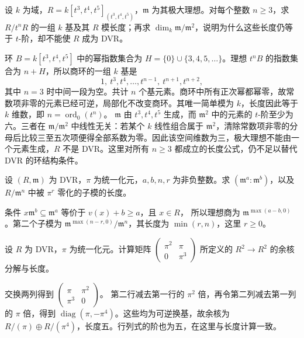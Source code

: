 \begin{exercise}\label{b3:ex:10-cusp-fails-dvr}
	设 \(k\) 为域，\(R=k[t^3,t^4,t^5]_{(t^3,t^4,t^5)}\)，\(\mathfrak m\) 为其极大理想。对每个整数 \(n\ge3\)，求 \(R/t^nR\) 的一组 \(k\) 基及其 \(R\) 模长度；再求 \(\dim_k\mathfrak m/\mathfrak m^2\)，说明为什么这些长度仍等于 \(t\)-阶，却不能使 \(R\) 成为 DVR。
\end{exercise}
\begin{solution}
	环 \(B=k[t^3,t^4,t^5]\) 中的幂指数集合为 \(H=\{0\}\cup\{3,4,5,\ldots\}\)。理想 \(t^nB\) 的指数集合为 \(n+H\)，所以商环的一组 \(k\) 基是
	\[
		1,\ t^3,t^4,\ldots,t^{n-1},\ t^{n+1},t^{n+2},
	\]
	其中 \(n=3\) 时中间一段为空。共计 \(n\) 个基元素。商环中所有正次幂都幂零，故常数项非零的元素已经可逆，局部化不改变商环。其唯一简单模为 \(k\)，长度因此等于 \(k\) 维数，即 \(n=\operatorname{ord}_0(t^n)\)。 \(\mathfrak m\) 由 \(t^3,t^4,t^5\) 生成，而 \(\mathfrak m^2\) 中的元素的 \(t\)-阶至少为六。三者在 \(\mathfrak m/\mathfrak m^2\) 中线性无关：若某个 \(k\) 线性组合属于 \(\mathfrak m^2\)，清除常数项非零的分母后比较三至五次项便得全部系数为零。因此该空间维数为三，极大理想不能由一个元素生成，\(R\) 不是 DVR。这里对所有 \(n\ge3\) 都成立的长度公式，仍不足以替代 DVR 的环结构条件。
\end{solution}

\begin{exercise}\label{b3:ex:10-dvr-colon}
	设 \((R,\mathfrak m)\) 为 DVR，\(\pi\) 为统一化元，\(a,b,n,r\) 为非负整数。求 \((\mathfrak m^a:\mathfrak m^b)\)，以及 \(R/\mathfrak m^n\) 中被 \(\pi^r\) 零化的子模的长度。
\end{exercise}
\begin{solution}
	条件 \(x\mathfrak m^b\subseteq\mathfrak m^a\) 等价于 \(v(x)+b\ge a\)，且 \(x\in R\)， 所以理想商为 \(\mathfrak m^{\max(a-b,0)}\)。第二个子模为 \(\mathfrak m^{\max(n-r,0)}/\mathfrak m^n\)，其长度为 \(\min(r,n)\)，这里 \(r\ge0\)。
\end{solution}

\begin{exercise}\label{b3:ex:10-dvr-presentation}
	设 \(R\) 为 DVR，\(\pi\) 为统一化元。计算矩阵
	\(\left(\begin{smallmatrix}\pi^2&\pi\\0&\pi^3\end{smallmatrix}\right)\)
	所定义的 \(R^2\rightarrow R^2\) 的余核分解与长度。
\end{exercise}
\begin{solution}
	交换两列得到 \(\left(\begin{smallmatrix}\pi&\pi^2\\\pi^3&0\end{smallmatrix}\right)\)。
	第二行减去第一行的 \(\pi^2\) 倍，再令第二列减去第一列的 \(\pi\) 倍，得到 \(\operatorname{diag}(\pi,-\pi^4)\)。这些均为可逆换基，故余核为 \(R/(\pi)\oplus R/(\pi^4)\)，长度五。行列式的阶也为五，在这里与长度计算一致。
\end{solution}

